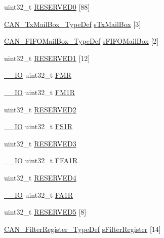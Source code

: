 \begin{DoxyCompactItemize}
\item 
uint32\-\_\-t \hyperlink{struct_c_a_n___type_def_af394c92193f1e52feaa7a27e090374ed}{R\-E\-S\-E\-R\-V\-E\-D0} \mbox{[}88\mbox{]}
\item 
\hyperlink{struct_c_a_n___tx_mail_box___type_def}{C\-A\-N\-\_\-\-Tx\-Mail\-Box\-\_\-\-Type\-Def} \hyperlink{struct_c_a_n___type_def_ab78f764584ec276cd36960d4f4fcdc1a}{s\-Tx\-Mail\-Box} \mbox{[}3\mbox{]}
\item 
\hyperlink{struct_c_a_n___f_i_f_o_mail_box___type_def}{C\-A\-N\-\_\-\-F\-I\-F\-O\-Mail\-Box\-\_\-\-Type\-Def} \hyperlink{struct_c_a_n___type_def_a90ff90723c0ec4ae8a7028d4f3b024f4}{s\-F\-I\-F\-O\-Mail\-Box} \mbox{[}2\mbox{]}
\item 
uint32\-\_\-t \hyperlink{struct_c_a_n___type_def_abd4c34405c765b5bd5fe38bbeb7569b6}{R\-E\-S\-E\-R\-V\-E\-D1} \mbox{[}12\mbox{]}
\item 
\hyperlink{group___c_m_s_i_s__core__definitions_gaec43007d9998a0a0e01faede4133d6be}{\-\_\-\-\_\-\-I\-O} uint32\-\_\-t \hyperlink{struct_c_a_n___type_def_a1a6a0f78ca703a63bb0a6b6f231f612f}{F\-M\-R}
\item 
\hyperlink{group___c_m_s_i_s__core__definitions_gaec43007d9998a0a0e01faede4133d6be}{\-\_\-\-\_\-\-I\-O} uint32\-\_\-t \hyperlink{struct_c_a_n___type_def_aefe6a26ee25947b7eb5be9d485f4d3b0}{F\-M1\-R}
\item 
uint32\-\_\-t \hyperlink{struct_c_a_n___type_def_ab29069c9fd10eeec47414abd8d06822f}{R\-E\-S\-E\-R\-V\-E\-D2}
\item 
\hyperlink{group___c_m_s_i_s__core__definitions_gaec43007d9998a0a0e01faede4133d6be}{\-\_\-\-\_\-\-I\-O} uint32\-\_\-t \hyperlink{struct_c_a_n___type_def_ac6296402924b37966c67ccf14a381976}{F\-S1\-R}
\item 
uint32\-\_\-t \hyperlink{struct_c_a_n___type_def_af730af32307f845895465e8ead57d20c}{R\-E\-S\-E\-R\-V\-E\-D3}
\item 
\hyperlink{group___c_m_s_i_s__core__definitions_gaec43007d9998a0a0e01faede4133d6be}{\-\_\-\-\_\-\-I\-O} uint32\-\_\-t \hyperlink{struct_c_a_n___type_def_ae2decd14b26f851e00a31b42d15293ce}{F\-F\-A1\-R}
\item 
uint32\-\_\-t \hyperlink{struct_c_a_n___type_def_a51c408c7c352b8080f0c6d42bf811d43}{R\-E\-S\-E\-R\-V\-E\-D4}
\item 
\hyperlink{group___c_m_s_i_s__core__definitions_gaec43007d9998a0a0e01faede4133d6be}{\-\_\-\-\_\-\-I\-O} uint32\-\_\-t \hyperlink{struct_c_a_n___type_def_ab57a3a6c337a8c6c7cb39d0cefc2459a}{F\-A1\-R}
\item 
uint32\-\_\-t \hyperlink{struct_c_a_n___type_def_a05b74b369ea3d9489caa4427c034c2a3}{R\-E\-S\-E\-R\-V\-E\-D5} \mbox{[}8\mbox{]}
\item 
\hyperlink{struct_c_a_n___filter_register___type_def}{C\-A\-N\-\_\-\-Filter\-Register\-\_\-\-Type\-Def} \hyperlink{struct_c_a_n___type_def_aaf5116cf475c48e9f4db550100faa2d9}{s\-Filter\-Register} \mbox{[}14\mbox{]}
\end{DoxyCompactItemize}


